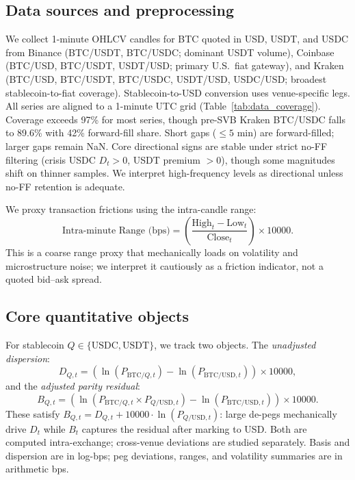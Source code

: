 \documentclass[12pt]{article}
\begin{document}
\subsection{Data sources and preprocessing}
We collect 1-minute OHLCV candles for BTC quoted in USD, USDT, and USDC from Binance (BTC/USDT, BTC/USDC; dominant USDT volume), Coinbase (BTC/USD, BTC/USDT, USDT/USD; primary U.S.\ fiat gateway), and Kraken (BTC/USD, BTC/USDT, BTC/USDC, USDT/USD, USDC/USD; broadest stablecoin-to-fiat coverage). Stablecoin-to-USD conversion uses venue-specific legs. All series are aligned to a 1-minute UTC grid (Table~\ref{tab:data_coverage}). Coverage exceeds 97\% for most series, though pre-SVB Kraken BTC/USDC falls to 89.6\% with 42\% forward-fill share. Short gaps ($\le5$ min) are forward-filled; larger gaps remain NaN. Core directional signs are stable under strict no-FF filtering (crisis USDC $D_t>0$, USDT premium $>0$), though some magnitudes shift on thinner samples. We interpret high-frequency levels as directional unless no-FF retention is adequate.



We proxy transaction frictions using the intra-candle range:
\begin{equation}
    \text{Intra-minute Range (bps)} = \left( \frac{\text{High}_t - \text{Low}_t}{\text{Close}_t} \right)\times 10000.
\end{equation}
This is a coarse range proxy that mechanically loads on volatility and microstructure noise; we interpret it cautiously as a friction indicator, not a quoted bid--ask spread.

\subsection{Core quantitative objects}

For stablecoin $Q\in\{\text{USDC}, \text{USDT}\}$, we track two objects. The \emph{unadjusted dispersion}:
\begin{equation}
    D_{Q,t}=\left(\ln(P_{\text{BTC}/Q,t})-\ln(P_{\text{BTC/USD},t})\right)\times 10000,
\end{equation}
and the \emph{adjusted parity residual}:
\begin{equation}
    B_{Q,t}
    = \left(\ln(P_{\text{BTC}/Q,t}\times P_{Q/\text{USD},t})-\ln(P_{\text{BTC/USD},t})\right)\times 10000.
\end{equation}
These satisfy $B_{Q,t}=D_{Q,t}+10000\cdot\ln(P_{Q/\text{USD},t})$: large de-pegs mechanically drive $D_t$ while $B_t$ captures the residual after marking to USD. Both are computed intra-exchange; cross-venue deviations are studied separately. Basis and dispersion are in log-bps; peg deviations, ranges, and volatility summaries are in arithmetic bps.
\end{document}
